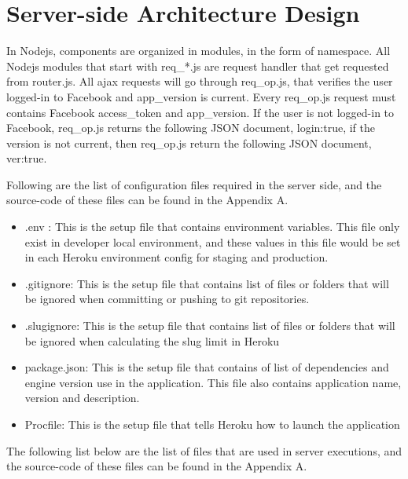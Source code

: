 \section{Server-side Architecture Design}

In Nodejs, components are organized in modules, in the form of namespace. All Nodejs modules that start with req{\_}*.js are request handler that get requested from router.js. All ajax requests will go through req{\_}op.js, that verifies the user logged-in to Facebook and app{\_}version is current. Every req{\_}op.js request must contains Facebook access{\_}token and app{\_}version. If the user is not logged-in to Facebook, req{\_}op.js returns the following JSON document, {login:true}, if the version is not current, then req{\_}op.js return the following JSON document, {ver:true}. 


Following are the list of configuration files required in the server side, and the source-code of these files can be found in the Appendix A.

\begin{itemize}
\item .env : This is the setup file that contains environment variables. This file only exist in developer local environment, and these values in this file would be set in each Heroku environment config for staging and production.  
\item .gitignore: This is the setup file that contains list of files or folders that will be ignored when committing or pushing to git repositories. 
\item .slugignore: This is the setup file that contains list of files or folders that will be ignored when calculating the slug limit in Heroku
\item package.json: This is the setup file that contains of list of dependencies and engine version use in the application. This file also contains application name, version and description.
\item Procfile: This is the setup file that tells Heroku how to launch the application
\end{itemize}


The following list below are the list of files that are used in server executions, and the source-code of these files can be found in the Appendix A.

